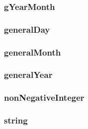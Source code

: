 \documentclass{article}
\begin{document}
\subsubsection*{gYearMonth}

\subsubsection*{generalDay}

\subsubsection*{generalMonth}

\subsubsection*{generalYear}

\subsubsection*{nonNegativeInteger}

\subsubsection*{string}
\end{document}
